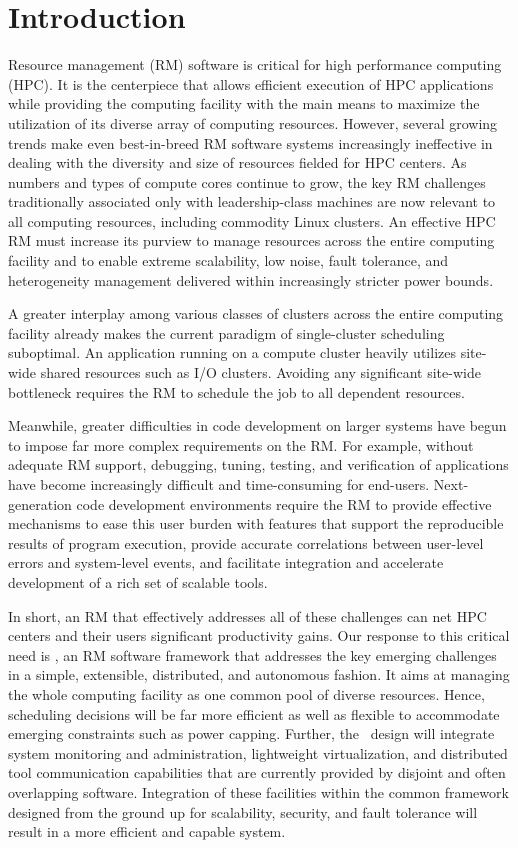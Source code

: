 \section{Introduction}

Resource management (RM) software is critical
for high performance computing (HPC).
It is the centerpiece that allows efficient
execution of HPC applications while providing
the computing facility with the main means
to maximize the utilization of its diverse array of computing
resources.
However, several growing trends make even
best-in-breed RM software systems increasingly ineffective
in dealing with the diversity and size of resources fielded for HPC centers.
As numbers and types of compute cores
continue to grow, the key RM challenges traditionally associated only
with leadership-class machines are now
relevant to all computing resources, including
commodity Linux clusters. An effective HPC RM must increase
its purview to manage resources across the entire
computing facility and to enable extreme scalability,
low noise, fault tolerance,
and heterogeneity management delivered within increasingly
stricter power bounds.

A greater interplay among various classes
of clusters across the entire computing facility already 
makes the current paradigm of single-cluster scheduling
suboptimal. An application running on a compute
cluster heavily utilizes site-wide shared resources
such as I/O clusters. 
Avoiding any significant site-wide bottleneck
requires the RM to schedule the job to all dependent
resources.

Meanwhile, greater difficulties in code development
on larger systems have begun to impose far more complex
requirements on the RM. For example, without adequate
RM support, debugging, tuning, testing, and verification
of applications have become increasingly difficult
and time-consuming for end-users.
Next-generation code development environments
require the RM to provide effective mechanisms
to ease this user burden with features that support the reproducible results of program execution,
provide accurate correlations between user-level errors
and system-level events,
and facilitate integration and accelerate development of a rich set of scalable tools.

In short, an RM that effectively
addresses all of these challenges can net HPC centers
and their users significant productivity gains.
Our response to this critical need is \flux,
an RM software framework that addresses the key emerging
challenges in a simple, extensible, distributed,
and autonomous fashion.
It aims at managing the whole computing facility
as one common pool of diverse resources.
Hence, scheduling decisions will be far more efficient
as well as flexible to accommodate emerging constraints
such as power capping.
Further, the \flux\ design will integrate system monitoring and
administration, lightweight virtualization, 
and distributed tool communication capabilities 
that are currently provided by disjoint
and often overlapping software. 
Integration of these facilities within the common framework
designed from the ground up for scalability, security,
and fault tolerance will result in a more efficient
and capable system.

